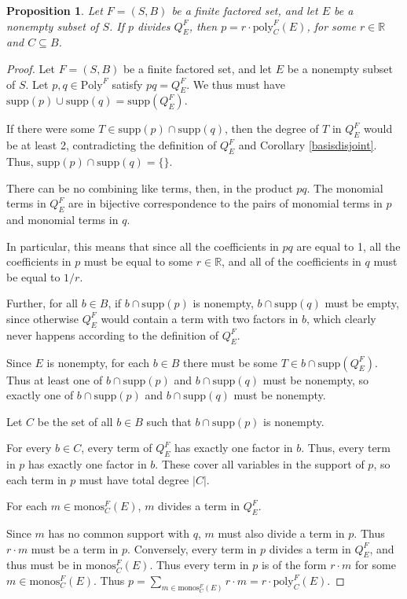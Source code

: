 \documentclass[authordate,onecolumn]{miri-tech-article}
\newtheorem{proposition}{Proposition}
\begin{document}
\begin{proposition}\label{factor2}
Let $F=(S,B)$ be a finite factored set, and let $E$ be a nonempty subset of $S$. If $p$ divides $Q^F_E$, then $p=r\cdot\text{poly}^F_C(E)$, for some $r\in \mathbb{R}$ and $C\subseteq B$.
\end{proposition}
\begin{proof}
Let $F=(S,B)$ be a finite factored set, and let $E$ be a nonempty subset of $S$. Let $p,q\in \text{Poly}^F$ satisfy  $pq=Q^F_E$. We thus
must have $\text{supp}(p)\cup\text{supp}(q)=\text{supp}(Q^F_E)$. 


If there were some $T\in \text{supp}(p)\cap\text{supp}(q)$, then the degree of $T$ in $Q^F_E$ would be at least 2, contradicting the definition of $Q^F_E$ and Corollary \ref{basisdisjoint}. Thus, $\text{supp}(p)\cap\text{supp}(q)=\{\}$.

There can be no combining like terms, then, in the product $pq$. The monomial terms in $Q^F_E$ are in bijective correspondence to the pairs of monomial terms in $p$ and monomial terms in $q$.

In particular, this means that since all the coefficients in $pq$ are equal to 1, all the coefficients in $p$ must be equal to some $r\in \mathbb{R}$,
and all of the coefficients in $q$ must be equal to $1/r$.

Further, for all $b\in B$, if $b\cap \text{supp}(p)$ is nonempty, $b\cap \text{supp}(q)$ must be empty, since otherwise $Q^F_E$ would contain a term with two factors in $b$, which clearly never happens according to the definition of $Q^F_E$. 

Since $E$ is nonempty, for each $b\in B$ there must be some $T\in b\cap \text{supp}(Q^F_E)$. Thus at least one of $b\cap \text{supp}(p)$ and $b\cap \text{supp}(q)$ must be nonempty, so exactly one of $b\cap \text{supp}(p)$ and $b\cap \text{supp}(q)$ must be nonempty.

Let $C$ be the set of all $b\in B$ such that $b\cap \text{supp}(p)$ is nonempty. 

For every $b\in C$, every term of $Q^F_E$ has exactly one factor in $b$. Thus, every term in $p$ has exactly one factor in $b$. These cover all variables in the support of $p$, so each term in $p$ must have total degree $|C|$.

For each $m\in \text{monos}^F_C(E)$, $m$ divides a term in $Q^F_E$.

Since $m$ has no common support with $q$, $m$ must also divide a term in $p$. Thus $r\cdot m$ must be a term in $p$. Conversely, every term in $p$ divides a term in $Q^F_E$, and thus must be in $\text{monos}^F_C(E)$. Thus every term in $p$ is of the form $r\cdot m$ for some $m\in\text{monos}^F_C(E)$. Thus $p=\sum_{m\in\text{monos}^F_C(E)}r\cdot m= r\cdot\text{poly}^F_C(E)$.
\end{proof}
\end{document}
